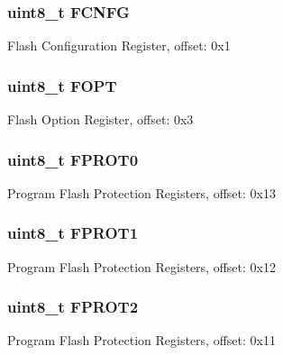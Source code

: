 \subsubsection[{F\+C\+N\+F\+G}]{\setlength{\rightskip}{0pt plus 5cm}uint8\+\_\+t F\+C\+N\+F\+G}\label{struct_f_t_f_a___mem_map_ab5c5e8faa06a25a28d3ff1e9baa83550}
Flash Configuration Register, offset\+: 0x1 \hypertarget{struct_f_t_f_a___mem_map_ad136314504ac1baf93f6254b0ac13ee6}{}
\subsubsection[{F\+O\+P\+T}]{\setlength{\rightskip}{0pt plus 5cm}uint8\+\_\+t F\+O\+P\+T}\label{struct_f_t_f_a___mem_map_ad136314504ac1baf93f6254b0ac13ee6}
Flash Option Register, offset\+: 0x3 \hypertarget{struct_f_t_f_a___mem_map_a36693d749fac8e3f218744ab5da5cda1}{}
\subsubsection[{F\+P\+R\+O\+T0}]{\setlength{\rightskip}{0pt plus 5cm}uint8\+\_\+t F\+P\+R\+O\+T0}\label{struct_f_t_f_a___mem_map_a36693d749fac8e3f218744ab5da5cda1}
Program Flash Protection Registers, offset\+: 0x13 \hypertarget{struct_f_t_f_a___mem_map_a99308b5052058ad416c35ce9f82507f5}{}
\subsubsection[{F\+P\+R\+O\+T1}]{\setlength{\rightskip}{0pt plus 5cm}uint8\+\_\+t F\+P\+R\+O\+T1}\label{struct_f_t_f_a___mem_map_a99308b5052058ad416c35ce9f82507f5}
Program Flash Protection Registers, offset\+: 0x12 \hypertarget{struct_f_t_f_a___mem_map_adfb9669bc3184da7e4b49c320970b1df}{}
\subsubsection[{F\+P\+R\+O\+T2}]{\setlength{\rightskip}{0pt plus 5cm}uint8\+\_\+t F\+P\+R\+O\+T2}\label{struct_f_t_f_a___mem_map_adfb9669bc3184da7e4b49c320970b1df}
Program Flash Protection Registers, offset\+: 0x11 \hypertarget{struct_f_t_f_a___mem_map_a84a4810c0a2da0b5c5a6205e551e0bf6}{}
